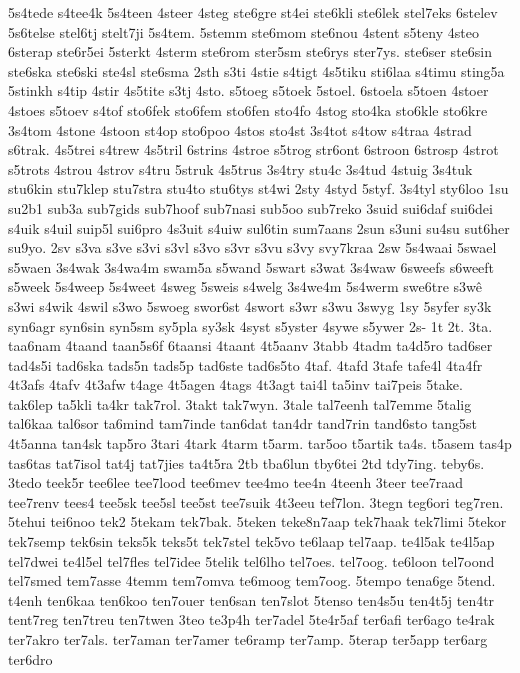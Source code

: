 {5s4tede
s4tee4k
5s4teen
4steer
4steg
ste6gre
st4ei
ste6kli
ste6lek
stel7eks
6stelev
5s6telse
stel6tj
stelt7ji
5s4tem.
5stemm
ste6mom
ste6nou
4stent
s5teny
4steo
6sterap
ste6r5ei
5sterkt
4sterm
ste6rom
ster5sm
ste6rys
ster7ys.
ste6ser
ste6sin
ste6ska
ste6ski
ste4sl
ste6sma
2sth
s3ti
4stie
s4tigt
4s5tiku
sti6laa
s4timu
sting5a
5stinkh
s4tip
4stir
4s5tite
s3tj
4sto.
s5toeg
s5toek
5stoel.
6stoela
s5toen
4stoer
4stoes
s5toev
s4tof
sto6fek
sto6fem
sto6fen
sto4fo
4stog
sto4ka
sto6kle
sto6kre
3s4tom
4stone
4stoon
st4op
sto6poo
4stos
sto4st
3s4tot
s4tow
s4traa
4strad
s6trak.
4s5trei
s4trew
4s5tril
6strins
4stroe
s5trog
str6ont
6stroon
6strosp
4strot
s5trots
4strou
4strov
s4tru
5struk
4s5trus
3s4try
stu4c
3s4tud
4stuig
3s4tuk
stu6kin
stu7klep
stu7stra
stu4to
stu6tys
st4wi
2sty
4styd
5styf.
3s4tyl
sty6loo
1su
su2b1
sub3a
sub7gids
sub7hoof
sub7nasi
sub5oo
sub7reko
3suid
sui6daf
sui6dei
s4uik
s4uil
suip5l
sui6pro
4s3uit
s4uiw
sul6tin
sum7aans
2sun
s3uni
su4su
sut6her
su9yo.
2sv
s3va
s3ve
s3vi
s3vl
s3vo
s3vr
s3vu
s3vy
svy7kraa
2sw
5s4waai
5swael
s5waen
3s4wak
3s4wa4m
swam5a
s5wand
5swart
s3wat
3s4waw
6sweefs
s6weeft
s5week
5s4weep
5s4weet
4sweg
5sweis
s4welg
3s4we4m
5s4werm
swe6tre
s3wê
s3wi
s4wik
4swil
s3wo
5swoeg
swor6st
4swort
s3wr
s3wu
3swyg
1sy
5syfer
sy3k
syn6agr
syn6sin
syn5sm
sy5pla
sy3sk
4syst
s5yster
4sywe
s5ywer
2s-
1t
2t.
3ta.
taa6nam
4taand
taan5s6f
6taansi
4taant
4t5aanv
3tabb
4tadm
ta4d5ro
tad6ser
tad4s5i
tad6ska
tads5n
tads5p
tad6ste
tad6s5to
4taf.
4tafd
3tafe
tafe4l
4ta4fr
4t3afs
4tafv
4t3afw
t4age
4t5agen
4tags
4t3agt
tai4l
ta5inv
tai7peis
5take.
tak6lep
ta5kli
ta4kr
tak7rol.
3takt
tak7wyn.
3tale
tal7eenh
tal7emme
5talig
tal6kaa
tal6sor
ta6mind
tam7inde
tan6dat
tan4dr
tand7rin
tand6sto
tang5st
4t5anna
tan4sk
tap5ro
3tari
4tark
4tarm
t5arm.
tar5oo
t5artik
ta4s.
t5asem
tas4p
tas6tas
tat7isol
tat4j
tat7jies
ta4t5ra
2tb
tba6lun
tby6tei
2td
tdy7ing.
teby6s.
3tedo
teek5r
tee6lee
tee7lood
tee6mev
tee4mo
tee4n
4teenh
3teer
tee7raad
tee7renv
tees4
tee5sk
tee5sl
tee5st
tee7suik
4t3eeu
tef7lon.
3tegn
teg6ori
teg7ren.
5tehui
tei6noo
tek2
5tekam
tek7bak.
5teken
teke8n7aap
tek7haak
tek7limi
5tekor
tek7semp
tek6sin
teks5k
teks5t
tek7stel
tek5vo
te6laap
tel7aap.
te4l5ak
te4l5ap
tel7dwei
te4l5el
tel7fles
tel7idee
5telik
tel6lho
tel7oes.
tel7oog.
te6loon
tel7oond
tel7smed
tem7asse
4temm
tem7omva
te6moog
tem7oog.
5tempo
tena6ge
5tend.
t4enh
ten6kaa
ten6koo
ten7ouer
ten6san
ten7slot
5tenso
ten4s5u
ten4t5j
ten4tr
tent7reg
ten7treu
ten7twen
3teo
te3p4h
ter7adel
5te4r5af
ter6afi
ter6ago
te4rak
ter7akro
ter7als.
ter7aman
ter7amer
te6ramp
ter7amp.
5terap
ter5app
ter6arg
ter6dro
}
